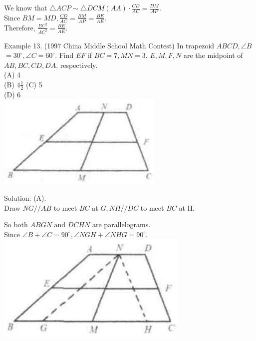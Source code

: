 \documentclass[10pt]{article}
\begin{document}
We know that \(\triangle A C P \sim \triangle D C M(A A) \cdot \frac{C D}{A C}=\frac{D M}{A P}\).\\
Since \(B M=M D, \frac{C D}{A C}=\frac{B M}{A P}=\frac{B E}{A E}\).\\
Therefore, \(\frac{B C^{2}}{A C^{2}}=\frac{B E}{A E}\).

Example 13. (1997 China Middle School Math Contest) In trapezoid \(A B C D, \angle B\) \(=30^{\circ}, \angle C=60^{\circ}\). Find \(E F\) if \(B C=7, M N=3\). \(E, M, F, N\) are the midpoint of \(A B, B C, C D, D A\), respectively.\\
(A) 4\\
(B) \(4 \frac{1}{2}\) (C) 5\\
(D) 6\\
\includegraphics[max width=\textwidth, center]{2025_04_17_97bc1f7e44d93c271a88g-116(2)}

Solution: (A).\\
Draw \(N G / / A B\) to meet \(B C\) at \(G, N H / / D C\) to meet \(B C\) at H.

So both \(A B G N\) and \(D C H N\) are parallelograms.\\
Since \(\angle B+\angle C=90^{\circ}, \angle N G H+\angle N H G=90^{\circ}\).\\
\includegraphics[max width=\textwidth, center]{2025_04_17_97bc1f7e44d93c271a88g-116(1)}
\end{document}
